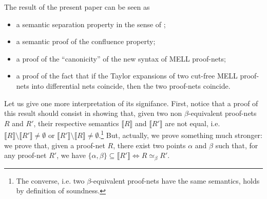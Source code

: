 \documentclass{article}
\theoremstyle{plain}
\newcommand{\sm}[1]{\llbracket #1 \rrbracket}
\begin{document}
The result of the present paper can be seen as
\begin{itemize}
\item a semantic separation property in the sense of \cite{Friedman};
\item a semantic proof of the confluence property;
\item a proof of the ``canonicity'' of the new syntax of MELL proof-nets;
\item a proof of the fact that if the Taylor expansions of two cut-free MELL proof-nets into differential nets \cite{EhrhardRegnier:DiffNets} coincide, then the two proof-nets coincide.
\end{itemize}
\begin{comment}
The relational semantics is very important for Linear Logic:\begin{itemize}
\item the interpretations of the proofs in the relational model are the same ones as in the non-uniform coherence semantics (\cite{bucciarelliehrhard01, Boudes11}) and in the category of weighted sets (\cite{classicalPCF});
\item we can closely relate the size of the points of the interpretations of the proof-nets in the relational model with the execution time of the proof-nets (\cite{phddecarvalho}, \cite{Carvalhoexecution} and \cite{CarvPagTdF10});
\item the relational semantics is a denotational semantics for differential nets \cite{EhrhardRegnier:DiffNets};\footnote{This is not the case with the coherence semantics.} these ones can be seen as a refinement of Linear Logic - the translation from LL proof-nets into differential nets is the Taylor expansion.
\end{itemize}
\end{comment}


Let us give one more interpretation of its signifance. First, notice that a proof of this result should consist in showing that, given two non $\beta$-equivalent proof-nets $R$ and $R'$, their respective semantics $\sm{R}$ and $\sm{R'}$ are not equal, i.e. $\sm{R} \setminus \sm{R'} \not= \emptyset$ or $\sm{R'} \setminus \sm{R} \not= \emptyset$.\footnote{The converse, i.e. two $\beta$-equivalent proof-nets have the same semantics, holds by definition of soundness.} But, actually, we prove something much stronger: we prove that, given a proof-net $R$, there exist two points $\alpha$ and $\beta$ such that, for any proof-net $R'$, we have $\{ \alpha, \beta \} \subseteq \sm{R'} \Leftrightarrow R \simeq_\beta R'$. 
\end{document}
